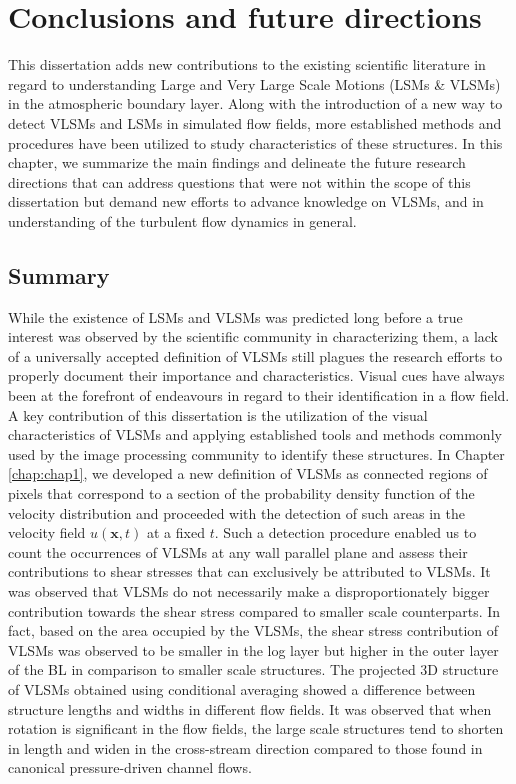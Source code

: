
\chapter{Conclusions and future directions}\label{chap:conclusion}
This dissertation adds new contributions to the existing scientific literature in regard to understanding Large and Very Large Scale Motions (LSMs \& VLSMs) in the atmospheric boundary layer. Along with the introduction of a new way to detect VLSMs and LSMs in simulated flow fields, more established methods and procedures have been utilized to study characteristics of these structures. In this chapter, we summarize the main findings and delineate the future research directions that can address questions that were not within the scope of this dissertation but demand new efforts to advance knowledge on VLSMs, and in understanding of the turbulent flow dynamics in general. 

\section{Summary}
While the existence of LSMs and VLSMs was predicted long before a true interest was observed by the scientific community in characterizing them, a lack of a universally accepted definition of VLSMs still plagues the research efforts to properly document their importance and characteristics. Visual cues have always been at the forefront of endeavours in regard to their identification in a flow field. A key contribution of this dissertation is the utilization of the visual characteristics of VLSMs and applying established tools and methods commonly used by the image processing community to identify these structures. In Chapter \ref{chap:chap1}, we developed a new definition of VLSMs as connected regions of pixels that correspond to a section of the probability density function of the velocity distribution and proceeded with the detection of such areas in the velocity field $u(\mathbf{x}, t)$ at a fixed $t$. Such a detection procedure enabled us to count the occurrences of VLSMs at any wall parallel plane and assess their contributions to shear stresses that can exclusively be attributed to VLSMs. It was observed that VLSMs do not necessarily make a disproportionately bigger contribution towards the shear stress compared to smaller scale counterparts. In fact, based on the area occupied by the VLSMs, the shear stress contribution of VLSMs was observed to be smaller in the log layer but higher in the outer layer of the BL in comparison to smaller scale structures. The projected 3D structure of VLSMs obtained using conditional averaging showed a difference between structure lengths and widths in different flow fields. It was observed that when rotation is significant in the flow fields, the large scale structures tend to shorten in length and widen in the cross-stream direction compared to those found in canonical pressure-driven channel flows. 

